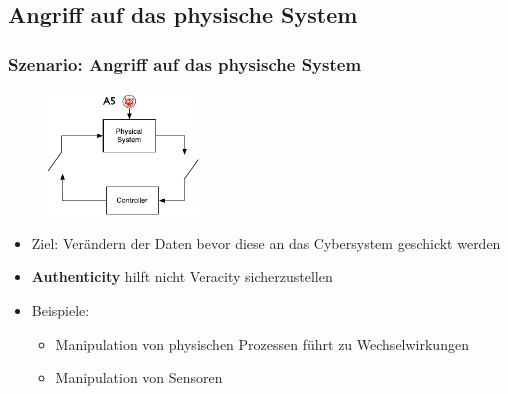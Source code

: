 \documentclass{sikslides}
\begin{document}
    \subsection{Angriff auf das physische System}
    \begin{frame}
        \frametitle{Szenario: Angriff auf das physische System}
        \begin{figure}
            \centering
            \includegraphics[width=4cm]{figure/physical}
        \end{figure}
        \begin{itemize}
            \item Ziel: Verändern der Daten bevor diese an das Cybersystem geschickt werden
            \item \textbf{Authenticity} hilft nicht Veracity sicherzustellen
            \pause
            \item Beispiele:
            \begin{itemize}
                \item Manipulation von physischen Prozessen führt zu Wechselwirkungen
                \item Manipulation von Sensoren
            \end{itemize}
        \end{itemize}
    \end{frame}


\end{document}
